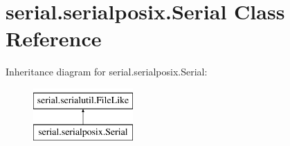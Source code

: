 \hypertarget{classserial_1_1serialposix_1_1_serial}{}\section{serial.\+serialposix.\+Serial Class Reference}
\label{classserial_1_1serialposix_1_1_serial}
Inheritance diagram for serial.\+serialposix.\+Serial\+:\begin{figure}[H]
\begin{center}
\leavevmode
\includegraphics[height=2.000000cm]{classserial_1_1serialposix_1_1_serial}
\end{center}
\end{figure}
